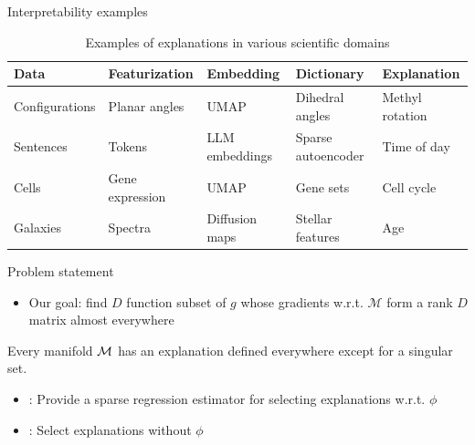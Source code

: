 \begin{frame}[fragile]{Interpretability examples}
\centering
\begin{figure}[H]
    \centering
{}
    \label{fig:summary}
\end{figure}
\begin{table}[H]
\tiny
\centering
\begin{tabular}{|p{1.8cm}|p{1.8cm}|p{2cm}|p{2.4cm}|p{2cm}|}
\hline
\textbf{Data} & \textbf{Featurization} &\textbf{Embedding} & \textbf{Dictionary} & \textbf{Explanation} \\
\hline
Configurations & Planar angles & UMAP & Dihedral angles & Methyl rotation \\
Sentences & Tokens & LLM embeddings & Sparse autoencoder & Time of day \\
Cells & Gene expression & UMAP & Gene sets & Cell cycle \\
Galaxies & Spectra & Diffusion maps & Stellar features & Age \\
\hline
\end{tabular}
\label{tab:concept_examples}
\caption*{Examples of explanations in various scientific domains}
\end{table}
\end{frame}


\begin{frame}{Problem statement}
\begin{itemize}
\item Our goal: find $D$ function subset of $g$ whose gradients w.r.t. $\mathcal M$ form a rank $D$ matrix almost everywhere
\end{itemize}
\begin{proposition}
Every manifold ${\cal M}$ has an explanation defined everywhere except for a singular set.
\end{proposition}
\begin{itemize}
    \item \cite{Koelle2022-oj}: Provide a sparse regression estimator for selecting explanations w.r.t. $\phi$
    \item \cite{Koelle2024-no}: Select explanations without $\phi$
\end{itemize}
\end{frame}

